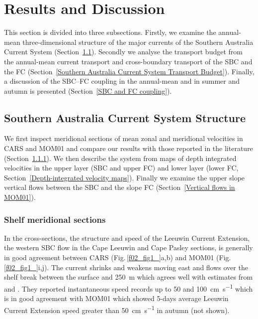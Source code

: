 \documentclass[preprint,3p,review,12pt]{elsarticle}
\begin{document}
\section{Results and Discussion} \label{Results and Discussion}
This section is divided into three subsections. Firstly, we examine the annual-mean three-dimensional structure of the major currents of the Southern Australia Current System (Section~\ref{Southern Australia Current System Structure}). Secondly we analyse the transport budget from the annual-mean current transport and cross-boundary transport of the SBC and the FC (Section~\ref{Southern Australia Current System Transport Budget}). Finally, a discussion of the SBC--FC coupling in the annual-mean and in summer and autumn is presented (Section~\ref{SBC and FC coupling}).

\subsection{Southern Australia Current System Structure} \label{Southern Australia Current System Structure}
We first inspect meridional sections of mean zonal and meridional velocities in CARS and MOM01 and compare our results with those reported in the literature (Section~\ref{Shelf meridional sections}). We then describe the system from maps of depth integrated velocities in the upper layer (SBC and upper FC) and lower layer (lower FC, Section~\ref{Depth-integrated velocity maps}). Finally we examine the upper slope vertical flows between the SBC and the slope FC (Section~\ref{Vertical flows in MOM01}).

\subsubsection{Shelf meridional sections}\label{Shelf meridional sections}
In the cross-sections, the structure and speed of the Leeuwin Current Extension, the western SBC flow in the Cape Leeuwin and Cape Pasley sections, is generally in good agreement between CARS (Fig.\,\ref{f02_fig1_}a,b) and MOM01 (Fig.\,\ref{f02_fig1_}i,j). The current shrinks and weakens moving east and flows over the shelf break between the surface and \SI{250}{\meter} which agrees well with estimates from \citet{Cresswell2004} and \citet{Cresswell1993}. They reported instantaneous speed records up to \num{50} and \SI{100}{\centi\meter\per\second} which is in good agreement with MOM01 which showed 5-days average Leeuwin Current Extension speed greater than \SI{50}{\centi\meter\per\second} in autumn (not shown).
\end{document}

